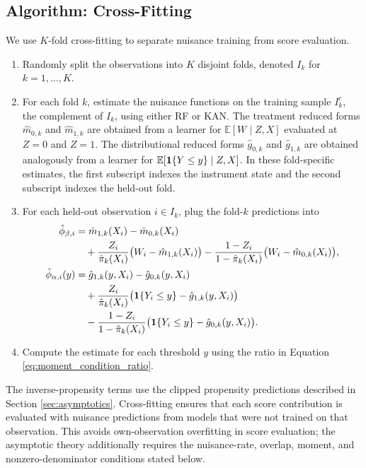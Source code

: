 \documentclass[final,3p,fleqn, 10pt]{elsarticle}
\begin{document}
\subsection{Algorithm: Cross-Fitting}
\label{subsec:cross_fitting_alg}
We use $K$-fold cross-fitting to separate nuisance training from score evaluation.
\begin{enumerate}[label=(\roman*)]
\item Randomly split the observations into $K$ disjoint folds, denoted $I_k$ for $k=1,\ldots,K$.
\item For each fold $k$, estimate the nuisance functions on the training sample $I_k^c$, the complement of $I_k$, using either RF or KAN. The treatment reduced forms $\hat{m}_{0,k}$ and $\hat{m}_{1,k}$ are obtained from a learner for $\mathbb{E}[W \mid Z,X]$ evaluated at $Z=0$ and $Z=1$. The distributional reduced forms $\hat{g}_{0,k}$ and $\hat{g}_{1,k}$ are obtained analogously from a learner for $\mathbb{E}[\mathbf{1}\{Y \le y\}\mid Z,X]$. In these fold-specific estimates, the first subscript indexes the instrument state and the second subscript indexes the held-out fold.
\item For each held-out observation $i \in I_k$, plug the fold-$k$ predictions into
    \begin{align*}
        \hat{\phi}_{\beta, i} &= \hat{m}_{1,k}(X_i) - \hat{m}_{0,k}(X_i) \\
        &\quad + \frac{Z_i}{\hat{\pi}_k(X_i)} \bigl(W_i - \hat{m}_{1,k}(X_i)\bigr)
        - \frac{1-Z_i}{1-\hat{\pi}_k(X_i)} \bigl(W_i - \hat{m}_{0,k}(X_i)\bigr), \\
        \hat{\phi}_{\alpha, i}(y) &= \hat{g}_{1,k}(y, X_i) - \hat{g}_{0,k}(y, X_i) \\
        &\quad + \frac{Z_i}{\hat{\pi}_k(X_i)} \bigl(\mathbf{1}\{Y_i \le y\} - \hat{g}_{1,k}(y, X_i)\bigr) \\
        &\quad - \frac{1-Z_i}{1-\hat{\pi}_k(X_i)} \bigl(\mathbf{1}\{Y_i \le y\} - \hat{g}_{0,k}(y, X_i)\bigr).
    \end{align*}
\item Compute the estimate for each threshold $y$ using the ratio in Equation \ref{eq:moment_condition_ratio}.
\end{enumerate}
The inverse-propensity terms use the clipped propensity predictions described in Section \ref{sec:asymptotics}. Cross-fitting ensures that each score contribution is evaluated with nuisance predictions from models that were not trained on that observation. This avoids own-observation overfitting in score evaluation; the asymptotic theory additionally requires the nuisance-rate, overlap, moment, and nonzero-denominator conditions stated below.
\end{document}
